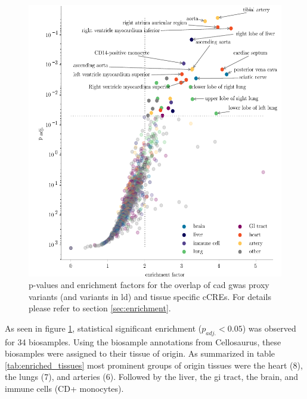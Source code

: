 \begin{figure}[h!]
\capstart
    \centering
	\includegraphics{Abbildung/enrichment_scatter.pdf}

	\begin{minipage}{\captionwidth}
		\caption[enrichemtn]{ \newline p-values and enrichment factors for the overlap of \ac{cad} \ac{gwas} proxy variants (and variants in \ac{ld}) and tissue specific \acp{cCRE}. For details please refer to section \ref{sec:enrichment}.}
		\label{fig:enrichment}
	\end{minipage}
\end{figure}

As seen in figure \ref{fig:enrichment}, statistical significant enrichment ($p_{adj.}<0.05$) was observed for 34 biosamples. Using the biosample annotations from Cellosaurus, these biosamples were assigned to their tissue of origin. As summarized in table \ref{tab:enriched_tissues} most prominent groups of origin tissues were the heart (8), the lungs (7), and arteries (6). Followed by the liver, the \ac{gi} tract, the brain, and immune cells (CD+ monocytes).



